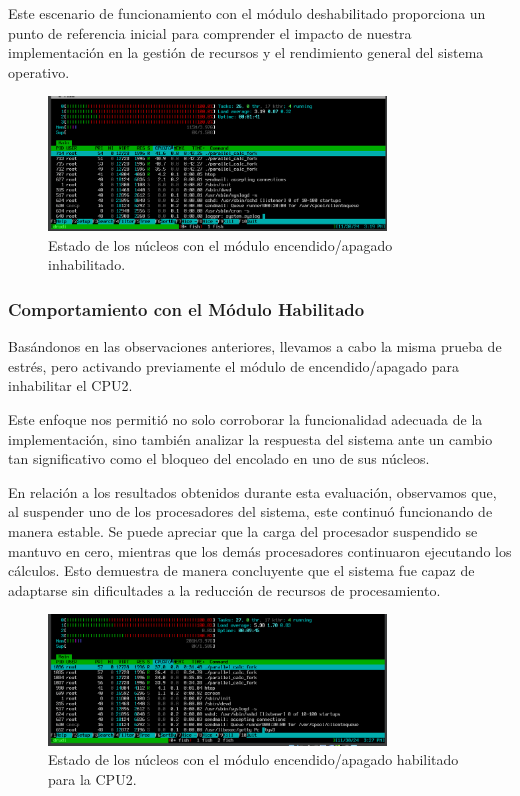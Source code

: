 Este escenario de funcionamiento con el módulo deshabilitado proporciona un punto de referencia inicial para comprender el impacto de nuestra implementación en la gestión de recursos y el rendimiento general del sistema operativo.\par

\begin{figure}[H]
    \centering
    \includegraphics[width=0.8\textwidth]{images/cpuOnOff-result-full-load.png}
    \caption{Estado de los núcleos con el módulo encendido/apagado inhabilitado.}
    \label{fig:cpuOnOff-result-full-load}
\end{figure}

\subsubsection{Comportamiento con el Módulo Habilitado}
Basándonos en las observaciones anteriores, llevamos a cabo la misma prueba de estrés, pero activando previamente el módulo de encendido/apagado para inhabilitar el CPU2.\par

Este enfoque nos permitió no solo corroborar la funcionalidad adecuada de la implementación, sino también analizar la respuesta del sistema ante un cambio tan significativo como el bloqueo del encolado en uno de sus núcleos.\par

En relación a los resultados obtenidos durante esta evaluación, observamos que, al suspender uno de los procesadores del sistema, este continuó funcionando de manera estable. Se puede apreciar que la carga del procesador suspendido se mantuvo en cero, mientras que los demás procesadores continuaron ejecutando los cálculos. Esto demuestra de manera concluyente que el sistema fue capaz de adaptarse sin dificultades a la reducción de recursos de procesamiento.\par

\begin{figure}[H]
    \centering
    \includegraphics[width=0.8\textwidth]{images/cpuOnOff-result-1CPU.png}
    \caption{Estado de los núcleos con el módulo encendido/apagado habilitado para la CPU2.}
    \label{fig:cpuOnOff-result-1cpu}
\end{figure}

